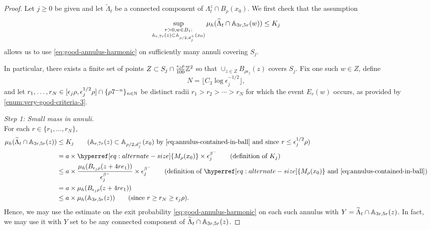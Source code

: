 \documentclass[12pt]{amsart}
\numberwithin{equation}{section}
\newcommand{\cluster}[2]{\hyperref[eq:non-co-set]{\mathit{\Lambda}^{#1}_{#2}}}
\newcommand{\Mrho}[2]{\hyperref[eq:alternate-size]{M_{#1}(#2)}}
\begin{document}
	\begin{proof} 
		Let $j \geq 0$ be given and let $\widetilde \Lambda_t$ be a connected component of ${\cluster{z}{t}} \cap B_{\rho}(x_0)$. We first check that the assumption 
		\[
		\sup_{\substack{r > 0 , w \in B_1 : \\ \mathbb{A}_{r, 7r}(z) \subset \mathbb{A}_{\rho/2, d^+_j}(x_0)}}    \mu_h(\widetilde \Lambda_t \cap \mathbb{A}_{3 r, 5r}(w)) \leq K_j
		\]
		allows us to use \eqref{eq:good-annulus-harmonic} on sufficiently many annuli covering $S_j$.
		
		In particular, there exists a finite set of points $Z\subset  S_j \cap \frac{\epsilon_j \rho}{100} \mathbb{Z}^2$ so that $\cup_{z\in Z} B_{\rho \epsilon_j}(z)$ 
		covers $S_j$. Fix one such $w \in Z$,
		define
		\[
		N = \lfloor C_3 \log \epsilon_j^{-1/2} \rfloor,
		\]
		and let $r_1, \ldots, r_N \in [\epsilon_j \rho, \epsilon_j^{1/2} \rho] \cap \{\rho 7^{-n}\}_{n \in \mathbb{N}}$ be distinct radii $r_1 > r_2 > \cdots > r_N$ for which the event $E_r(w)$ occurs, as provided by \ref{enum:very-good-criteria-3}. 
		
		
		
		{\it Step 1: Small mass in annuli. } \\ 
		For each $r \in \{ r_1, \ldots, r_N\}$,
		\begin{align*}
		\mu_h(\widetilde \Lambda_t \cap \A_{3r,5r }(z)) 
		&\leq K_j \qquad \mbox{($\A_{r, 7r}(z) \subset \A_{\rho/2, d_j^+}(x_0)$ by \eqref{eq:annulus-contained-in-ball} and since $r  \leq \epsilon_j^{1/2} \rho$)} \\
		&= a \times \Mrho{\rho}{x_0} \times \epsilon^{\beta^-}_j  \qquad \mbox{(definition of $K_j$)}\\
		&\leq a \times \frac{\mu_h(B_{\epsilon_j \rho }(z + 4 r e_1))}{\epsilon_j^{\beta^-}} \times  \epsilon_j^{\beta^-} \qquad \mbox{(definition of $\Mrho{\rho}{x_0}$ and \eqref{eq:annulus-contained-in-ball})}  \\
		&= a \times \mu_h(B_{\epsilon_j \rho}(z + 4 r e_1)) \\
		&\leq a \times \mu_h(\A_{3 r, 5 r}(z)) \qquad \mbox{(since $r \geq r_N \geq \epsilon_j \rho$)}.
		\end{align*} 
		Hence, we may use the estimate on the exit probability  \eqref{eq:good-annulus-harmonic} on each such annulus with $Y = \widetilde \Lambda_t \cap \mathbb{A}_{3r,5r }(z)$.
		In fact, we may use it with $Y$ set to be any connected component of  $\widetilde \Lambda_t \cap \mathbb{A}_{3r,5r }(z)$.
		

\end{proof}
\end{document}
